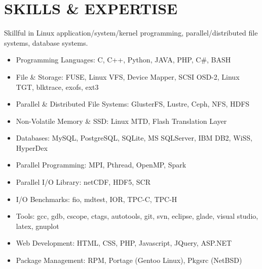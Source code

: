 \section{SKILLS \& EXPERTISE}
Skillful in Linux application/system/kernel programming, parallel/distributed file systems, database systems.
\begin{itemize}
\item {Programming Languages}: C, C++, Python, JAVA, PHP, C\#, BASH
\item {File \& Storage}: FUSE, Linux VFS, Device Mapper, SCSI OSD-2, Linux TGT, blktrace, exofs, ext3
\item {Parallel \& Distributed File Systems}: GlusterFS, Lustre, Ceph, NFS, HDFS
\item {Non-Volatile Memory \& SSD}: Linux MTD, Flash Translation Layer
\item {Databases}: MySQL, PostgreSQL, SQLite, MS SQLServer, IBM DB2, WiSS, HyperDex
\item {Parallel Programming}: MPI, Pthread, OpenMP, Spark
\item {Parallel I/O Library}: netCDF, HDF5, SCR
\item {I/O Benchmarks}: fio, mdtest, IOR, TPC-C, TPC-H
\item {Tools}: gcc, gdb, cscope, ctags, autotools, git, svn, eclipse, glade, visual studio, latex, gnuplot
\item {Web Development}: HTML, CSS, PHP, Javascript, JQuery, ASP.NET
\item {Package Management}: RPM, Portage (Gentoo Linux), Pkgsrc (NetBSD)
\end{itemize}

